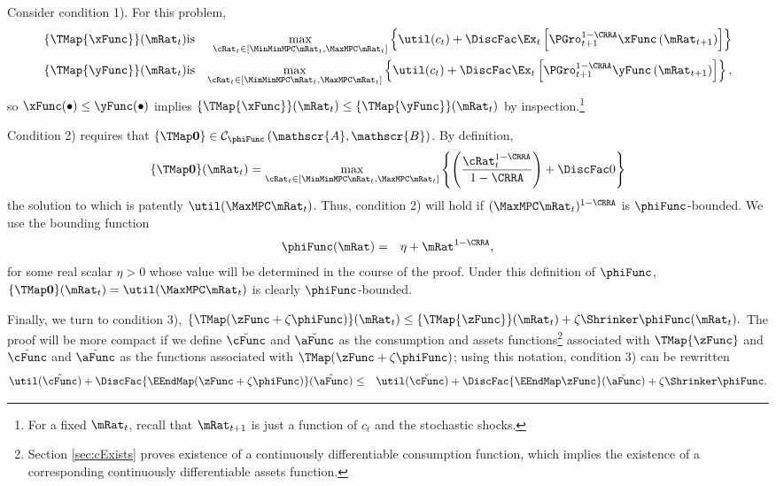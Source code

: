 \documentclass[titlepage]{\econtex}\providecommand{\texname}{BufferStockTheory}
\begin{document}
Consider condition 1). For this problem,
\begin{eqnarray*}
\{\TMap{\mathfrak{\xFunc}}\}(\mRat_{t}) &\mbox{is}&\underset{\cRat_{t} \in
[\MinMinMPC \mRat_{t}, \MaxMPC \mRat_{t}]
}\max \left\{
\util(c_{t})+\DiscFac \Ex_{t}\left[ {\PGro}_{t+1}^{1-\CRRA }{\mathfrak{\xFunc}}
\left( {\mRat}_{t+1}\right) \right] \right\}  \notag  \label{eq:condition1}
\\
\{\TMap{\mathfrak{\yFunc}}\}(\mRat_{t}) &\mbox{is}&\underset{\cRat_{t} \in
[\MinMinMPC \mRat_{t}, \MaxMPC \mRat_{t}]
}\max \left\{
\util(c_{t})+\DiscFac \Ex_{t}\left[ {\PGro}_{t+1}^{1-\CRRA }{\mathfrak{\yFunc}}
\left( {\mRat}_{t+1}\right) \right] \right\} ,  \notag
\end{eqnarray*}%
so ${\mathfrak{\xFunc}}(\bullet) \leq {\mathfrak{\yFunc}}(\bullet)$ implies $\{\TMap{\mathfrak{\xFunc}}\}(\mRat_{t}) \leq \{\TMap{\mathfrak{\yFunc}} \}(\mRat_{t})$ by inspection.\footnote{For a fixed $\mRat_{t}$, recall that ${\mRat}_{t+1}$ is just a function of $c_{t}$ and the
stochastic shocks.}

Condition 2) requires that $\{\TMap\mathbf{0}\}\in \mathcal{C}_{\phiFunc}\left(\mathscr{A},\mathscr{B}\right)$. By definition,
\begin{equation*}
\{\TMap \mathbf{0}\}(\mRat_{t}) = \max_{\cRat_{t} \in
[\MinMinMPC \mRat_{t}, \MaxMPC \mRat_{t}]
}\left\{ \left( \frac{\cRat_{t}^{1-\CRRA }}{1-\CRRA }\right) +\DiscFac 0\right\}
\end{equation*}
the solution to which is patently
$\util(\MaxMPC \mRat_{t})$. Thus, condition 2)
will hold if $(\MaxMPC \mRat_{t})^{1-\CRRA}$ is $\phiFunc$-bounded.  We use
the bounding function
\begin{eqnarray}
  \label{eq:phiFunc}
  \phiFunc(\mRat) & = & \eta + \mRat^{1-\CRRA},
\end{eqnarray}
for some real scalar $\eta > 0$ whose value will be determined in the
course of the proof. Under this definition of $\phiFunc$,
$\{\TMap\mathbf{0}\}(\mRat_{t})= \util(\MaxMPC \mRat_{t})$
is clearly
$\phiFunc$-bounded.

Finally, we turn to condition 3), $\{\TMap({\zFunc} +\zeta\phiFunc
)\}(\mRat_{t}) \leq \{\TMap{\zFunc}\}(\mRat_{t}) +\zeta \Shrinker
\phiFunc(\mRat_{t}).$ The proof will be more compact if we define
$\breve{\cFunc}$ and $\breve{\aFunc}$ as the consumption and assets
functions\footnote{Section \ref{sec:cExists} proves existence of a
  continuously differentiable consumption function, which implies the
  existence of a corresponding continuously differentiable assets
  function.}  associated with $\TMap{\zFunc}$ and $\hat{\cFunc}$ and
$\hat{\aFunc}$ as the functions associated with $\TMap({\zFunc+\zeta
  \phiFunc})$; using this notation, condition 3) can be rewritten
\begin{eqnarray*}
\util(\hat{\cFunc})+\DiscFac \{\EEndMap (\zFunc+\zeta \phiFunc) \}(\hat{\aFunc})  & \leq & \util(\breve{\cFunc})+\DiscFac \{\EEndMap \zFunc \}(\breve{\aFunc})  + \zeta \Shrinker \phiFunc.
\end{eqnarray*}
\end{document}
